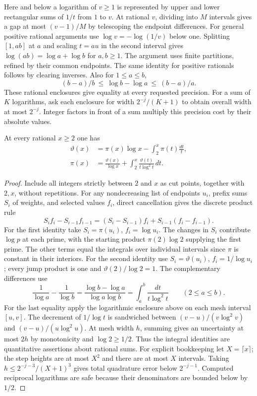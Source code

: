 Here and below a logarithm of $v\ge1$ is represented by upper and lower rectangular sums of $1/t$ from $1$ to $v$. At rational $v$, dividing into $M$ intervals gives a gap at most $(v-1)/M$ by telescoping the endpoint differences. For general positive rational arguments use $\log v=-\log(1/v)$ below one. Splitting $[1,ab]$ at $a$ and scaling $t=au$ in the second interval gives $\log(ab)=\log a+\log b$ for $a,b\ge1$. The argument uses finite partitions, refined by their common endpoints. The same identity for positive rationals follows by clearing inverses. Also for $1\le a\le b$,
\[
 (b-a)/b\ \le\ \log b-\log a\ \le\ (b-a)/a.
\]
These rational enclosures give equality at every requested precision. For a sum of $K$ logarithms, ask each enclosure for width $2^{-j}/(K+1)$ to obtain overall width at most $2^{-j}$. Integer factors in front of a sum multiply this precision cost by their absolute values.

\begin{theorem}
At every rational $x\ge2$ one has
\begin{align*}
 \vartheta(x)&=\pi(x)\log x-\int_2^x \pi(t)\frac{dt}{t},\\
 \pi(x)&=\frac{\vartheta(x)}{\log x}
        +\int_2^x\frac{\vartheta(t)}{t\log^2t}\,dt .
\end{align*}
\end{theorem}
\begin{proof}
Include all integers strictly between $2$ and $x$ as cut points, together with $2,x$, without repetitions. For any nondecreasing list of endpoints $u_i$, prefix sums $S_i$ of weights, and selected values $f_i$, direct cancellation gives the discrete product rule
\[
 S_i f_i-S_{i-1}f_{i-1}=(S_i-S_{i-1})f_i+S_{i-1}(f_i-f_{i-1}).
\]
For the first identity take $S_i=\pi(u_i)$, $f_i=\log u_i$. The changes in $S_i$ contribute $\log p$ at each prime, with the starting product $\pi(2)\log2$ supplying the first prime. The other terms equal the integrals over individual intervals since $\pi$ is constant in their interiors. For the second identity use $S_i=\vartheta(u_i)$, $f_i=1/\log u_i$; every jump product is one and $\vartheta(2)/\log2=1$. The complementary differences use
\[
 \frac{1}{\log a}-\frac{1}{\log b}
  =\frac{\log b-\log a}{\log a\log b}
  =\int_a^b\frac{dt}{t\log^2t}\qquad(2\le a\le b).
\]
For the last equality apply the logarithmic enclosure above on each mesh interval $[u,v]$. The decrement of $1/\log t$ is sandwiched between $(v-u)/(v\log^2 v)$ and $(v-u)/(u\log^2 u)$. At mesh width $h$, summing gives an uncertainty at most $2h$ by monotonicity and $\log2\ge1/2$. Thus the integral identities are quantitative assertions about rational sums. For explicit bookkeeping let $X=\lceil x\rceil$; the step heights are at most $X^2$ and there are at most $X$ intervals. Taking $h\le2^{-j-3}/(X+1)^3$ gives total quadrature error below $2^{-j-1}$. Computed reciprocal logarithms are safe because their denominators are bounded below by $1/2$.
\end{proof}

